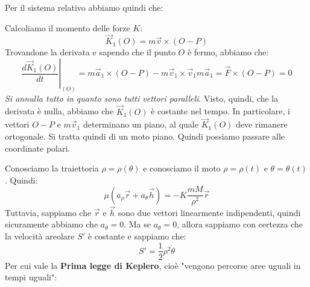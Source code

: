 \documentclass[11pt,a4paper,twoside]{article}
\theoremstyle{definition}
\begin{document}
Per il sistema relativo abbiamo quindi che:
\begin{center}
\end{center}
Calcoliamo il momento delle forze $K$:
\[ \vec K_1 (O) = m\vec v \times (O-P) \]
Trovandone la derivata e sapendo che il punto $O$ è fermo, abbiamo che:
\[ \left. \frac{d \vec K_1(O)}{dt}\right|_{(O)} = m\vec a_1 \times (O-P) - m\vec v_1 \times \vec v_1 m\vec a_1 = \vec F \times (O-P) = 0\]
\textit{Si annulla tutto in quanto sono tutti vettori paralleli}. Visto, quindi, che la derivata è nulla, abbiamo che $\vec K_1(O)$ è costante nel tempo. In particolare, i vettori $O-P$ e $m\vec v_1$ determinano un piano, al quale $\vec K_1(O)$ deve rimanere ortogonale. Si tratta quindi di un moto piano. Quindi possiamo passare alle coordinate polari.
\begin{center}
\end{center}
Conosciamo la traiettoria $\rho = \rho(\theta)$ e conosciamo il moto $\rho = \rho(t)$ e $\theta = \theta (t)$. Quindi:
\[ \mu(a_\rho \vec r + a_\theta \vec h) = -K \frac{mM}{\rho^2}\vec r\]
Tuttavia, sappiamo che $\vec r$ e $\vec h$ sono due vettori linearmente indipendenti, quindi sicuramente abbiamo che $a_\theta = 0$. Ma se $a_\theta = 0$, allora sappiamo con certezza che la velocità areolare $S'$ è costante e sappiamo che:
\[ S' = \frac 12 \rho^2 \dot \theta \]
Per cui vale la \textbf{Prima legge di Keplero}, cioè "vengono percorse aree uguali in tempi uguali":
\begin{center}
\end{center}
\end{document}
